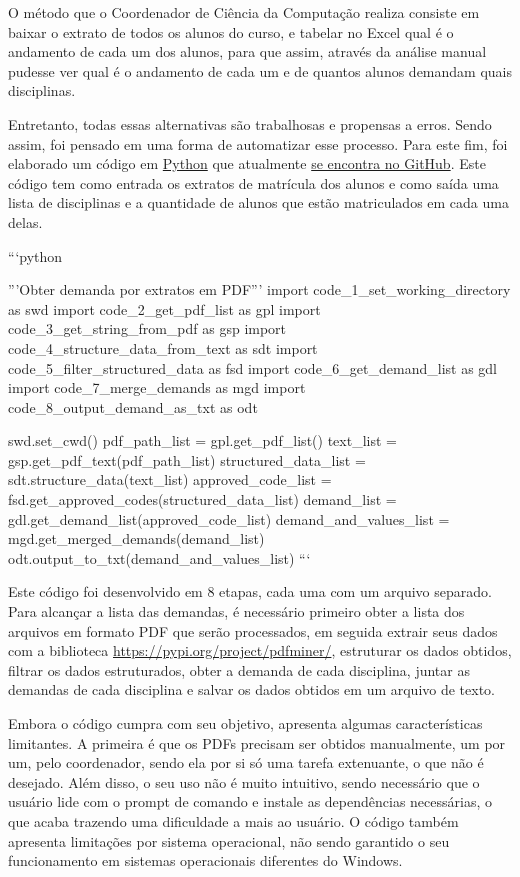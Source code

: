         O método que o Coordenador de Ciência da Computação realiza consiste em baixar o extrato de todos os alunos do curso, e tabelar no Excel qual é o andamento de cada um dos alunos, para que assim, através da análise manual pudesse ver qual é o andamento de cada um e de quantos alunos demandam quais disciplinas.

        Entretanto, todas essas alternativas são trabalhosas e propensas a erros. Sendo assim, foi pensado em uma forma de automatizar esse processo. Para este fim, foi elaborado um código em \href{https://www.python.org/}{Python} que atualmente \href{https://github.com/jvfd3/university_demand}{se encontra no GitHub}. Este código tem como entrada os extratos de matrícula dos alunos e como saída uma lista de disciplinas e a quantidade de alunos que estão matriculados em cada uma delas.

        ```python

        '''Obter demanda por extratos em PDF'''
        import code_1_set_working_directory     as swd
        import code_2_get_pdf_list              as gpl
        import code_3_get_string_from_pdf       as gsp
        import code_4_structure_data_from_text  as sdt
        import code_5_filter_structured_data    as fsd
        import code_6_get_demand_list           as gdl
        import code_7_merge_demands             as mgd
        import code_8_output_demand_as_txt      as odt

        swd.set_cwd()
        pdf_path_list           = gpl.get_pdf_list()
        text_list               = gsp.get_pdf_text(pdf_path_list)
        structured_data_list    = sdt.structure_data(text_list)
        approved_code_list      = fsd.get_approved_codes(structured_data_list)
        demand_list             = gdl.get_demand_list(approved_code_list)
        demand_and_values_list  = mgd.get_merged_demands(demand_list)
        odt.output_to_txt(demand_and_values_list)
        ```

        Este código foi desenvolvido em 8 etapas, cada uma com um arquivo separado. Para alcançar a lista das demandas, é necessário primeiro obter a lista dos arquivos em formato PDF que serão processados, em seguida extrair seus dados com a biblioteca \href{PDFMiner}{https://pypi.org/project/pdfminer/}, estruturar os dados obtidos, filtrar os dados estruturados, obter a demanda de cada disciplina, juntar as demandas de cada disciplina e salvar os dados obtidos em um arquivo de texto.

        Embora o código cumpra com seu objetivo, apresenta algumas características limitantes. A primeira é que os PDFs precisam ser obtidos manualmente, um por um, pelo coordenador, sendo ela por si só uma tarefa extenuante, o que não é desejado. Além disso, o seu uso não é muito intuitivo, sendo necessário que o usuário lide com o prompt de comando e instale as dependências necessárias, o que acaba trazendo uma dificuldade a mais ao usuário. O código também apresenta limitações por sistema operacional, não sendo garantido o seu funcionamento em sistemas operacionais diferentes do Windows.

